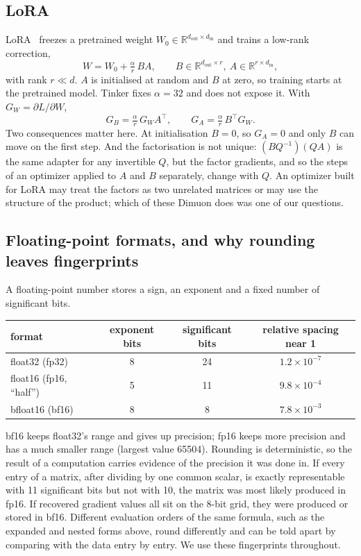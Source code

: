 \documentclass[11pt]{article}
\begin{document}
\subsection{LoRA}
LoRA~\cite{lora} freezes a pretrained weight $W_0\in\mathbb{R}^{d_\text{out}\times d_\text{in}}$ and
trains a low-rank correction,
\[
W=W_0+\tfrac{\alpha}{r}\,BA,\qquad B\in\mathbb{R}^{d_\text{out}\times r},\ A\in\mathbb{R}^{r\times d_\text{in}},
\]
with rank $r\ll d$. $A$ is initialised at random and $B$ at zero, so training starts at the
pretrained model. Tinker fixes $\alpha=32$ and does not expose it. With $G_W=\partial L/\partial W$,
\[
G_B=\tfrac{\alpha}{r}\,G_WA^\top,\qquad G_A=\tfrac{\alpha}{r}\,B^\top G_W .
\]
Two consequences matter here. At initialisation $B=0$, so $G_A=0$ and only $B$ can move on the first
step. And the factorisation is not unique: $(BQ^{-1})(QA)$ is the same adapter for any invertible
$Q$, but the factor gradients, and so the steps of an optimizer applied to $A$ and $B$ separately,
change with $Q$. An optimizer built for LoRA may treat the factors as two unrelated matrices or may
use the structure of the product; which of these Dimuon does was one of our questions.

\subsection{Floating-point formats, and why rounding leaves fingerprints}\label{sec:fp}
A floating-point number stores a sign, an exponent and a fixed number of significant bits.
\begin{center}\small
\begin{tabular}{lccc}\toprule
format & exponent bits & significant bits & relative spacing near 1\\\midrule
float32 (fp32) & 8 & 24 & $1.2\times10^{-7}$\\
float16 (fp16, ``half'') & 5 & 11 & $9.8\times10^{-4}$\\
bfloat16 (bf16) & 8 & 8 & $7.8\times10^{-3}$\\\bottomrule
\end{tabular}
\end{center}
bf16 keeps float32's range and gives up precision; fp16 keeps more precision and has a much smaller
range (largest value 65504). Rounding is deterministic, so the result of a computation carries
evidence of the precision it was done in. If every entry of a matrix, after dividing by one common
scalar, is exactly representable with 11 significant bits but not with 10, the matrix was most likely
produced in fp16. If recovered gradient values all sit on the 8-bit grid, they were produced or
stored in bf16. Different evaluation orders of the same formula, such as the expanded and nested
forms above, round differently and can be told apart by comparing with the data entry by entry. We use
these fingerprints throughout.
\end{document}
